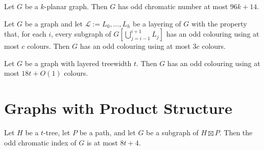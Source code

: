 \documentclass{patmorin}
\begin{document}
\begin{cor}\label{k_planar}
  Let $G$ be a $k$-planar graph.  Then $G$ has odd chromatic number at most $96k+14$.
\end{cor}

\begin{lem}\label{three_layer}
  Let $G$ be a graph and let $\mathcal{L}:=L_0,\ldots,L_h$ be a layering of $G$ with the property that, for each $i$, every subgraph of $G[\bigcup_{j=i-1}^{i+1}L_{j}]$ has an odd colouring using at most $c$ colours. Then $G$ has an odd colouring using at most $3c$ colours.
\end{lem}





\begin{thm}
  Let $G$ be a graph with layered treewidth $t$.  Then $G$ has an odd colouring using at most $18t+O(1)$ colours.
\end{thm}





\section{Graphs with Product Structure}

\begin{thm}\label{new_result}
  Let $H$ be a $t$-tree, let $P$ be a path, and let $G$ be a subgraph of $H\boxtimes P$. Then the odd chromatic index of $G$ is at most $8t+4$.
\end{thm}
\end{document}
